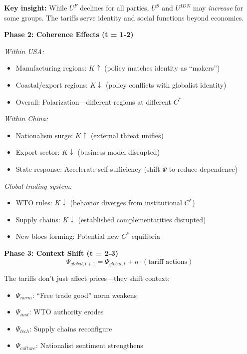 \textbf{Key insight:} While $U^F$ declines for all parties,
$U^S$ and $U^{IDN}$ may \emph{increase} for some groups.
The tariffs serve identity and social functions beyond economics.

\textbf{Phase 2: Coherence Effects (t = 1-2)}

\emph{Within USA:}
\begin{itemize}
  \item Manufacturing regions: $K \uparrow$ (policy matches identity as ``makers'')
  \item Coastal/export regions: $K \downarrow$ (policy conflicts with globalist identity)
  \item Overall: Polarization---different regions at different $C^*$
\end{itemize}

\emph{Within China:}
\begin{itemize}
  \item Nationalism surge: $K \uparrow$ (external threat unifies)
  \item Export sector: $K \downarrow$ (business model disrupted)
  \item State response: Accelerate self-sufficiency (shift $\Psi$ to reduce dependence)
\end{itemize}

\emph{Global trading system:}
\begin{itemize}
  \item WTO rules: $K \downarrow$ (behavior diverges from institutional $C^*$)
  \item Supply chains: $K \downarrow$ (established complementarities disrupted)
  \item New blocs forming: Potential new $C^*$ equilibria
\end{itemize}

\textbf{Phase 3: Context Shift (t = 2-3)}
\begin{equation}
  \Psi_{global, t+1} = \Psi_{global, t} + \eta \cdot (\text{tariff actions})
\end{equation}

The tariffs don't just affect prices---they shift context:
\begin{itemize}
  \item $\Psi_{norm}$: ``Free trade good'' norm weakens
  \item $\Psi_{inst}$: WTO authority erodes
  \item $\Psi_{tech}$: Supply chains reconfigure
  \item $\Psi_{culture}$: Nationalist sentiment strengthens
\end{itemize}

